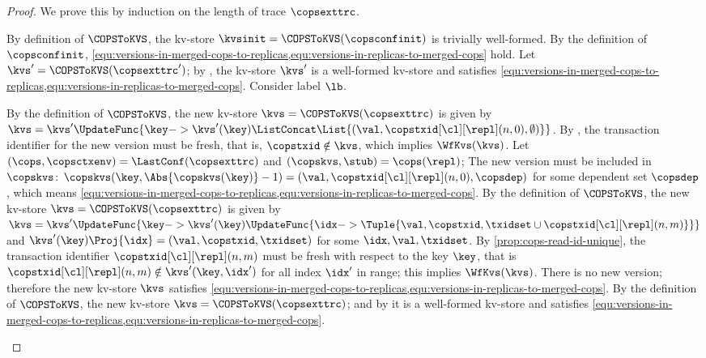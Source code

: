 \begin{proof}
We prove this by induction on the length of trace \( \copsexttrc \).
\begin{enumerate}
\Cases{\( \copsexttrc = \copsconfinit \)}
    By definition of \( \COPSToKVS \), 
    the kv-store \(\kvsinit = \COPSToKVS(\copsconfinit) \) is trivially well-formed.
    By the definition of \( \copsconfinit \), 
    \cref{equ:versions-in-merged-cops-to-replicas,equ:versions-in-replicas-to-merged-cops} hold.
    Let \( \kvs' = \COPSToKVS(\copsexttrc') \);
    by \ih, the kv-store \( \kvs' \) is a well-formed kv-store 
    and satisfies \cref{equ:versions-in-merged-cops-to-replicas,equ:versions-in-replicas-to-merged-cops}.
    Consider label \( \lb \).
    \begin{enumerate}
        By the definition of \( \COPSToKVS \), 
        the new kv-store \( \kvs = \COPSToKVS(\copsexttrc) \) is given by
        \( \kvs = \kvs'\UpdateFunc{\key -> \kvs'(\key) \ListConcat \List{(\val,\copstxid[\cl][\repl](n,0),\emptyset)}} \).
        By \rCOPSWrite, the transaction identifier for the new version must be fresh, 
        that is, \( \copstxid \notin \kvs \), which implies \( \WfKvs(\kvs) \).
        Let \( (\cops,\copsctxenv) = \LastConf(\copsexttrc) \) and \( (\copskvs, \stub) = \cops(\repl) \);
        The new version must be included in \( \copskvs \):
        \( \copskvs(\key,\Abs{\copskvs(\key)} - 1) = (\val, \copstxid[\cl][\repl](n,0),\copsdep ) \) 
        for some dependent set \( \copsdep \),
        which means \cref{equ:versions-in-merged-cops-to-replicas,equ:versions-in-replicas-to-merged-cops}.
        By the definition of \( \COPSToKVS \), 
        the new kv-store \( \kvs = \COPSToKVS(\copsexttrc) \) is given by
        \( \kvs = \kvs'\UpdateFunc{\key -> \kvs'(\key)\UpdateFunc{\idx -> \Tuple{\val,\copstxid,\txidset \cup \copstxid[\cl][\repl](n,m)}}} \)
        and \(\kvs'(\key)\Proj{\idx} = (\val,\copstxid,\txidset)\) for some \( \idx, \val, \txidset \).
        By \cref{prop:cops-read-id-unique},
        the transaction identifier \( \copstxid[\cl][\repl](n,m) \) must be fresh with respect to the key \( \key \),
        that is \( \copstxid[\cl][\repl](n,m) \notin \kvs'(\key,\idx') \) for all index \( \idx' \) in range;
        this implies \( \WfKvs(\kvs) \).
        There is no new version; 
        therefore the new kv-store \( \kvs \) satisfies \cref{equ:versions-in-merged-cops-to-replicas,equ:versions-in-replicas-to-merged-cops}.
        By the definition of \( \COPSToKVS \), the new kv-store \( \kvs = \COPSToKVS(\copsexttrc) \);
        and by \ih it is a well-formed kv-store and satisfies \cref{equ:versions-in-merged-cops-to-replicas,equ:versions-in-replicas-to-merged-cops}.  
    \end{enumerate}
\end{enumerate}
\end{proof}

